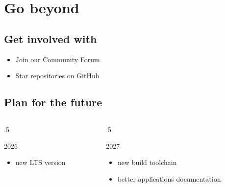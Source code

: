 \section{Go beyond}


\subsection{Get involved with \TAOCE}
\begin{frame}
    \bigicon{\faStar}
    \begin{itemize}
        \item Join our Community Forum
        \item Star \taoceorg repositories on GitHub
    \end{itemize}
\end{frame}

\subsection{Plan for the future}
\begin{frame}
    \begin{columns}[T]
        \begin{column}{.5\textwidth}\begin{block}{}
            2026
            \begin{itemize}
                \item new LTS version
            \end{itemize}
        \end{block}\end{column}
        \begin{column}{.5\textwidth}\begin{block}{}
            2027
            \begin{itemize}
                \item new build toolchain
                \item better applications documentation
            \end{itemize}
        \end{block}\end{column}
    \end{columns}
\end{frame}